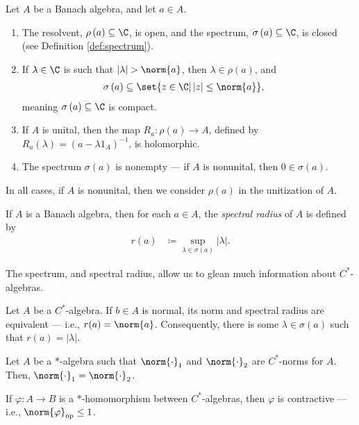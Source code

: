 \begin{theorem}\label{thm:spectrum_of_cstar_algebras}
  Let $A$ be a Banach algebra, and let $a\in A$.
  \begin{enumerate}[(1)]
    \item The resolvent, $\rho\left( a \right)\subseteq \C$, is open, and the spectrum, $\sigma\left( a \right)\subseteq \C$, is closed (see Definition \ref{def:spectrum}).
    \item If $\lambda\in\C$ is such that $\left\vert \lambda \right\vert > \norm{a}$, then $\lambda\in \rho(a)$, and 
      \begin{align*}
        \sigma\left( a \right) &\subseteq \set{z\in\C | \left\vert z \right\vert\leq \norm{a}},
      \end{align*}
      meaning $\sigma\left( a \right)\subseteq \C$ is compact.
    \item If $A$ is unital, then the map $R_a\colon \rho\left( a \right)\rightarrow A$, defined by $R_a\left( \lambda \right) = \left( a - \lambda 1_A \right)^{-1}$, is holomorphic.
    \item The spectrum $\sigma\left( a \right)$ is nonempty --- if $A$ is nonunital, then $0\in \sigma\left( a \right)$.
  \end{enumerate}
\end{theorem}
\begin{remark}
  In all cases, if $A$ is nonunital, then we consider $\rho\left( a \right)$ in the unitization of $A$.
\end{remark}
\begin{definition}{\cite[Definition 7.3.5]{rainone_analysis}}
  If $A$ is a Banach algebra, then for each $a\in A$, the \textit{spectral radius} of $A$ is defined by
  \begin{align*}
    r(a) &\coloneq \sup_{\lambda\in \sigma\left( a \right)}\left\vert \lambda \right\vert.
  \end{align*}
\end{definition}
The spectrum, and spectral radius, allow us to glean much information about $C^{\ast}$-algebras.
\begin{proposition}\label{prop:normal_spectral_radius}
  Let $A$ be a $C^{\ast}$-algebra. If $b\in A$ is normal, its norm and spectral radius are equivalent --- i.e., $r(a) =\norm{a} $. Consequently, there is some $\lambda\in \sigma\left( a \right)$ such that $r(a) = \left\vert \lambda \right\vert$.
\end{proposition}
\begin{proposition}
  Let $A$ be a ${\ast}$-algebra such that $\norm{\cdot}_1$ and $\norm{\cdot}_2$ are $C^{\ast}$-norms for $A$. Then, $\norm{\cdot}_1 = \norm{\cdot}_2$.
\end{proposition}
\begin{proposition}
  If $\varphi\colon A\rightarrow B$ is a $\ast$-homomorphism between $C^{\ast}$-algebras, then $\varphi$ is contractive --- i.e., $\norm{\varphi}_{\op}\leq 1$.
\end{proposition}
